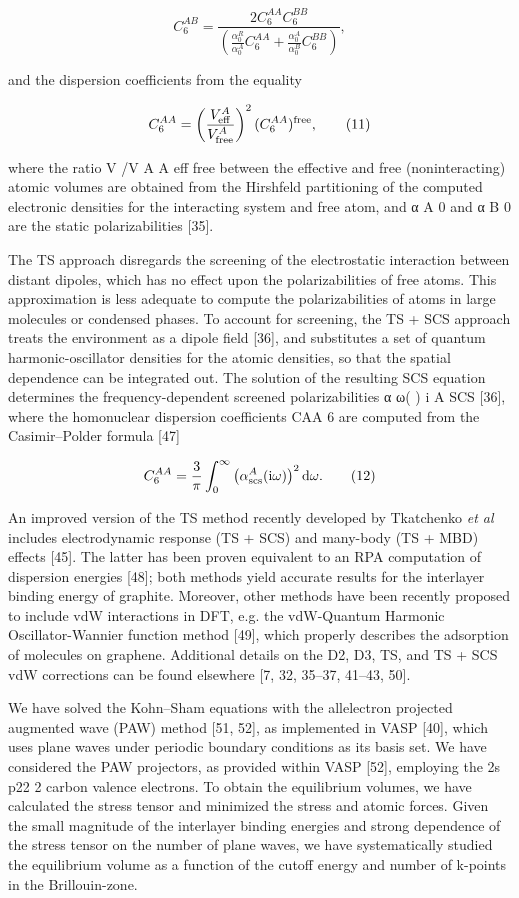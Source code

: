 \documentclass{article}
\begin{document}
$$C_{6}^{AB}=\frac{2C_{6}^{AA}C_{6}^{BB}}{\left(\frac{\alpha_{0}^{R}}{\alpha_{0}^{A}}C_{6}^{AA}+\frac{\alpha_{0}^{A}}{\alpha_{0}^{B}}C_{6}^{BB}\right)},\tag{10}$$

and the dispersion coefficients from the equality

$$C_{6}^{AA}=\left(\frac{V_{\rm eff}^{A}}{V_{\rm free}^{A}}\right)^{2}(C_{6}^{AA})^{\rm free},\tag{11}$$

where the ratio V /V A A eff free between the effective and free (noninteracting) atomic volumes are obtained from the Hirshfeld partitioning of the computed electronic densities for the interacting system and free atom, and α A 0 and α B 0 are the static polarizabilities [35].

The TS approach disregards the screening of the electrostatic interaction between distant dipoles, which has no effect upon the polarizabilities of free atoms. This approximation is less adequate to compute the polarizabilities of atoms in large molecules or condensed phases. To account for screening, the TS + SCS approach treats the environment as a dipole field [36], and substitutes a set of quantum harmonic-oscillator densities for the atomic densities, so that the spatial dependence can be integrated out. The solution of the resulting SCS equation determines the frequency-dependent screened polarizabilities α ω( ) i A SCS [36], where the homonuclear dispersion coefficients CAA 6 are computed from the Casimir–Polder formula [47]

$$C_{6}^{AA}=\frac{3}{\pi}\int_{0}^{\infty}\left(\alpha_{\rm scs}^{A}({\rm i}\omega)\right)^{2}{\rm d}\omega.\tag{12}$$

An improved version of the TS method recently developed by Tkatchenko \textit{et al} includes electrodynamic response (TS + SCS) and many-body (TS + MBD) effects [45]. The latter has been proven equivalent to an RPA computation of dispersion energies [48]; both methods yield accurate results for the interlayer binding energy of graphite. Moreover, other methods have been recently proposed to include vdW interactions in DFT, e.g. the vdW-Quantum Harmonic Oscillator-Wannier function method [49], which properly describes the adsorption of molecules on graphene. Additional details on the D2, D3, TS, and TS + SCS vdW corrections can be found elsewhere [7, 32, 35–37, 41–43, 50].

We have solved the Kohn–Sham equations with the allelectron projected augmented wave (PAW) method [51, 52], as implemented in VASP [40], which uses plane waves under periodic boundary conditions as its basis set. We have considered the PAW projectors, as provided within VASP [52], employing the 2s p22 2 carbon valence electrons. To obtain the equilibrium volumes, we have calculated the stress tensor and minimized the stress and atomic forces. Given the small magnitude of the interlayer binding energies and strong dependence of the stress tensor on the number of plane waves, we have systematically studied the equilibrium volume as a function of the cutoff energy and number of k-points in the Brillouin-zone.
\end{document}
